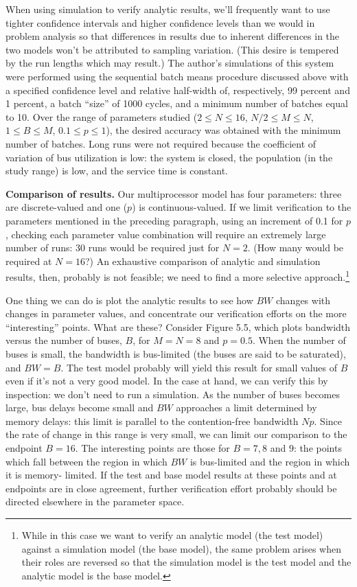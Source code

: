 When using simulation to verify analytic results, we'll frequently want
to use tighter confidence intervals and higher confidence levels than we
would in problem analysis so that differences in results due to inherent
differences in the two models won't be attributed to sampling variation.
(This desire is tempered by the run lengths which may result.) The author's
simulations of this system were performed using the sequential batch means
procedure discussed above with a specified confidence level and relative
half-width of, respectively, 99 percent and 1 percent, a batch ``size'' of 1000
cycles, and a minimum number of batches equal to 10. Over the range of
parameters studied ($2\le N\le16$, $N/2\le M\le N$, $1\le B\le M$, $0.1\le p\le1$), the desired
accuracy was obtained with the minimum number of batches. Long runs were
not required because the coefficient of variation of bus utilization is low: the
system is closed, the population (in the study range) is low, and the service
time is constant.

\noindent\textbf{Comparison of results.} Our multiprocessor model has four parameters:
three are discrete-valued and one ($p$) is continuous-valued. If we limit
verification to the parameters mentioned in the preceding paragraph, using
an increment of 0.1 for $p$, checking each parameter value combination will
require an extremely large number of runs: 30 runs would be required just for
$N=2$. (How many would be required at $N=16$?) An exhaustive comparison
of analytic and simulation results, then, probably is not feasible; we need to
find a more selective approach.\footnote{While in this case we want to verify an analytic model (the test model) against a simulation model (the base model), the same problem arises when their roles are reversed so that the simulation model is the test model and the analytic model is the base model.}

One thing we can do is plot the analytic results to see how $BW$ changes
with changes in parameter values, and concentrate our verification efforts on
the more ``interesting'' points. What are these? Consider Figure 5.5, which
plots bandwidth versus the number of buses, $B$, for $M=N=8$ and $p=0.5$. When
the number of buses is small, the bandwidth is bus-limited (the buses are
said to be saturated), and $BW=B$. The test model probably will yield this
result for small values of $B$ even if it's not a very good model. In the case at
hand, we can verify this by inspection: we don't need to run a simulation. As
the number of buses becomes large, bus delays become small and $BW$
approaches a limit determined by memory delays: this limit is parallel to
the contention-free bandwidth $Np$. Since the rate of change in this range is
very small, we can limit our comparison to the endpoint $B=16$. The
interesting points are those for $B=7,8$ and $9$: the points which fall between
the region in which $BW$ is bus-limited and the region in which it is memory-
limited. If the test and base model results at these points and at endpoints
are in close agreement, further verification effort probably should be
directed elsewhere in the parameter space.

